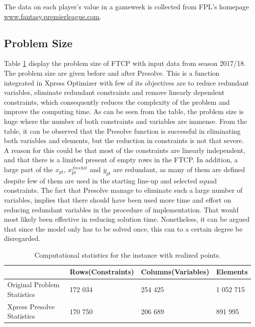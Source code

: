 \newpar

The data on each player's value in a gameweek is collected from FPL's homepage \url{www.fantasy.premierleague.com}. 

\subsection{Problem Size}

Table \ref{tab:computational_statistics} display the problem size of FTCP with input data from season 2017/18. The problem size are given before and after Presolve. This is a function integrated in Xpress Optimizer with few of its objectives are to reduce redundant variables, eliminate redundant constraints and remove linearly dependent constraints, which consequently reduces the complexity of the problem and improve the computing time. As can be seen from the table, the problem size is huge where the number of both constraints and variables are immense. From the table, it can be observed that the Presolve function is successful in eliminating both variables and elements, but the reduction in constraints is not that severe. A reason for this could be that most of the constraints are linearly independent, and that there is a limited present of empty rows in the FTCP. In addition, a large part of the $x_{pt}$, $x_{pt}^{freehit}$ and $y_{pt}$ are redundant, as many of them are defined despite few of them are used in the starting line-up and selected squad constraints. The fact that Presolve manage to eliminate such a large number of variables, implies that there should have been used more time and effort on reducing redundant variables in the procedure of implementation. That would most likely been effective in reducing solution time. Nonetheless, it can be argued that since the model only has to be solved once, this can to a certain degree be disregarded. 


\begin{table}[H]
\centering
\caption{Computational statistics for the instance with realized points.}
\label{tab:computational_statistics}
\begin{tabular}{@{}llll@{}}
\toprule
                            & Rows(Constraints)    & Columns(Variables) & Elements \\ \midrule
Original Problem Statistics & 172 034 & 254 425  & 1 052 715  \\
Xpress Presolve Statistics  & 170 750 & 206 689  & 891 995   \\ \bottomrule
\end{tabular}
\end{table}




